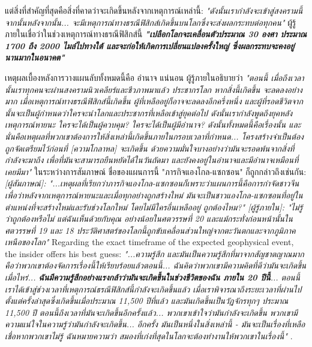 \documentclass[10pt,twocolumn,letterpaper]{article}
\begin{document}
แต่สิ่งที่สำคัญที่สุดคือสิ่งที่คาดว่าจะเกิดขึ้นหลังจากเหตุการณ์เหล่านี้: \textit{"ดังนั้นเรากำลังจะเข้าสู่สงครามนี้ จากนั้นหลังจากนั้น... จะมีเหตุการณ์ทางธรณีฟิสิกส์เกิดขึ้นบนโลกซึ่งจะส่งผลกระทบต่อทุกคน"} \cite{4} ผู้รู้ภายในเชื่อว่าในช่วงเหตุการณ์ทางธรณีฟิสิกส์นี้ \textit{\textbf{"เปลือกโลกจะเคลื่อนตัวประมาณ 30 องศา ประมาณ 1700 ถึง 2000 ไมล์ไปทางใต้ และจะก่อให้เกิดการเปลี่ยนแปลงครั้งใหญ่ ซึ่งผลกระทบจะคงอยู่นานมากในอนาคต"}} \cite{4}

เหตุผลเบื้องหลังการวางแผนลับทั้งหมดนี้คือ อำนาจ แน่นอน ผู้รู้ภายในอธิบายว่า \textit{"ตอนนี้ เมื่อถึงเวลานั้นเราทุกคนจะผ่านสงครามนิวเคลียร์และชีวภาพมาแล้ว ประชากรโลก หากสิ่งนี้เกิดขึ้น จะลดลงอย่างมาก เมื่อเหตุการณ์ทางธรณีฟิสิกส์นี้เกิดขึ้น ผู้ที่เหลืออยู่ก็อาจจะลดลงอีกครึ่งหนึ่ง และผู้ที่รอดชีวิตจากนั้นจะเป็นผู้กำหนดว่าใครจะนำโลกและประชากรที่เหลือเข้าสู่ยุคต่อไป ดังนั้นเรากำลังพูดถึงยุคหลังเหตุการณ์หายนะ ใครจะได้เป็นผู้ควบคุม? ใครจะได้เป็นผู้มีอำนาจ? ดังนั้นทั้งหมดนี้คือเรื่องนั้น และนั่นคือเหตุผลที่พวกเขาต้องการให้สิ่งเหล่านี้เกิดขึ้นภายในกรอบเวลาที่กำหนด... โครงสร้างจำเป็นต้องถูกจัดเตรียมไว้ก่อนที่ [ความโกลาหล] จะเกิดขึ้น ด้วยความมั่นใจบางอย่างว่ามันจะรอดพ้นจากสิ่งที่กำลังจะมาถึง เพื่อที่มันจะสามารถยืนหยัดได้ในวันถัดมา และยังคงอยู่ในอำนาจและมีอำนาจเหมือนที่เคยมีมา"} \cite{4} ในระหว่างการสัมภาษณ์ ชื่อของแผนการนี้ "ภารกิจแองโกล-แซกซอน" ก็ถูกกล่าวถึงเช่นกัน: \textit{[ผู้สัมภาษณ์]: "...เหตุผลที่เรียกว่าภารกิจแองโกล-แซกซอนก็เพราะว่าแผนการนี้คือการกำจัดชาวจีนเพื่อว่าหลังจากเหตุการณ์หายนะและเมื่อทุกอย่างถูกสร้างใหม่ มันจะเป็นชาวแองโกล-แซกซอนที่อยู่ในตำแหน่งที่จะสร้างใหม่และรับช่วงโลกใหม่ โดยไม่มีใครอื่นเหลืออยู่ ถูกต้องไหม?" [ผู้รู้ภายใน]: "ไม่รู้ว่าถูกต้องหรือไม่ แต่ฉันเห็นด้วยกับคุณ อย่างน้อยในศตวรรษที่ 20 และแม้กระทั่งก่อนหน้านั้นในศตวรรษที่ 19 และ 18 ประวัติศาสตร์ของโลกนี้ถูกขับเคลื่อนส่วนใหญ่จากตะวันตกและจากภูมิภาคเหนือของโลก"} \cite{4}
Regarding the exact timeframe of the expected geophysical event, the insider offers his best guess: \textit{"...ความรู้สึก และมันเป็นความรู้สึกที่มาจากสัญชาตญาณมาก คือว่าพวกเขาต้องจัดการเรื่องนี้ให้เรียบร้อยแล้วตอนนี้... ฉันคิดว่าพวกเขามีความคิดที่ดีว่ามันจะเกิดขึ้นเมื่อไหร่... \textbf{ฉันมีความรู้สึกอย่างแรงกล้าว่ามันจะเกิดขึ้นในช่วงชีวิตของฉัน ภายใน 20 ปีนี้}... ตอนนี้เราได้เข้าสู่ช่วงเวลาที่เหตุการณ์ธรณีฟิสิกส์นี้กำลังจะเกิดขึ้นแล้ว เมื่อเราพิจารณาถึงระยะเวลาที่ผ่านไปตั้งแต่ครั้งล่าสุดซึ่งเกิดขึ้นเมื่อประมาณ 11,500 ปีที่แล้ว และมันเกิดขึ้นเป็นวัฏจักรทุกๆ ประมาณ 11,500 ปี ตอนนี้ถึงเวลาที่มันจะเกิดขึ้นอีกครั้งแล้ว... พวกเขาเข้าใจว่ามันกำลังจะเกิดขึ้น พวกเขามีความแน่ใจในความรู้ว่ามันกำลังจะเกิดขึ้น... อีกครั้ง มันเป็นหนึ่งในสิ่งเหล่านี้ - มันจะเป็นเรื่องที่เหลือเชื่อหากพวกเขาไม่รู้ ฉันหมายความว่า สมองที่เก่งที่สุดในโลกจะต้องทำงานให้พวกเขาในเรื่องนี้"} \cite{4}.
\end{document}
